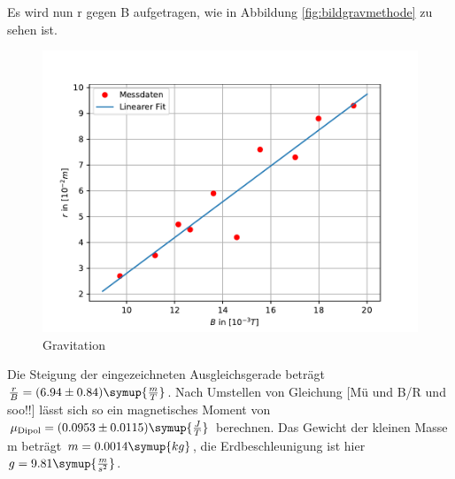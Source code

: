 Es wird nun r gegen B aufgetragen, wie in Abbildung \eqref{fig:bildgravmethode} zu sehen ist.
\begin{figure}[h]
\centering
\includegraphics[scale=.9]{GravMethode.pdf}
\caption{Gravitation}
\label{fig:bildgravmethode}
\end{figure}
Die Steigung der eingezeichneten Ausgleichsgerade beträgt $\frac {r}{B}= (6.94 \pm 0.84) \symup{\frac{m}{T}}$.
Nach Umstellen von Gleichung [Mü und B/R und soo!!] lässt sich so ein magnetisches Moment von $\mu_{\text{Dipol}} = (0.0953 \pm 0.0115)
\symup{\frac{J}{T}}$ berechnen. Das Gewicht der kleinen Masse m beträgt $m = 0.0014 \symup{kg}$, die Erdbeschleunigung
ist hier $g = 9.81 \symup{\frac{m}{s^2}}$.


